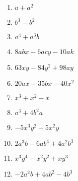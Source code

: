 \documentclass[12pt, a4paper]{article}
\begin{document}
\begin{enumerate}
\begin{multicols}{3}
\begin{enumerate}
		\item $a+a^2$
		\item $b^3-b^2$ 
		\item $a^4+a^3b$ 
		\item $8abx-6acy-10ak$ 
		\item $63xy-84y^2+98ay$
		\item $20ax-35bx-40x^2$ 
		\item $x^3+x^2-x$
		\item $a^3+4b^2a$ 
		\item $-5x^3y^2-5x^2y$ 
		\item $2a^3b-6ab^4+4a^2b^3$
		\item $x^3y^4-x^2y^2+xy^3$ 
		\item $-2a^2b+4ab^2-4b^3$ 
	\end{enumerate}	
\end{multicols}
\end{enumerate}
\end{document}
